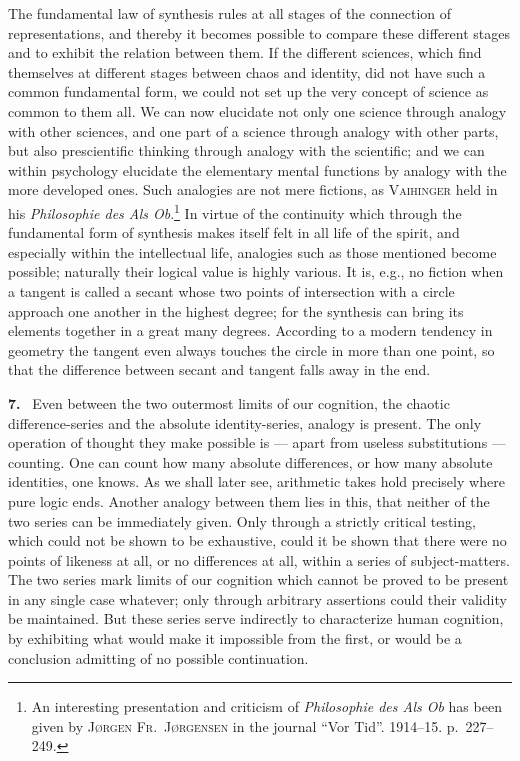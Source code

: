 \documentclass[12pt]{book}
\newcommand{\hnum}[1]{\noindent\textbf{#1.}~}
\newcommand{\opage}[1]{\marginnote{\footnotesize\textit{[#1]}}}
\begin{document}
The fundamental law of synthesis rules at all stages of the con\-nec\-tion of
rep\-re\-sen\-ta\-tions, and thereby it becomes possible to compare these different
stages and to exhibit the relation between them. If the different sciences,
which find themselves at different stages between chaos and identity, did not
have such a common fundamental form, we could not set up the very concept of
science as common to them all. We can now elucidate not only one science through
analogy with other \opage{41}sciences, and one part of a science through analogy with
other parts, but also prescientific thinking through analogy with the
scientific; and we can within psychology elucidate the elementary mental
functions by analogy with the more developed ones. Such analogies are not mere
fictions, as \textsc{Vaihinger} held in his \textit{Philosophie des Als
Ob}.\footnote{An interesting presentation and criticism of \textit{Philosophie
des Als Ob} has been given by \textsc{Jørgen Fr.\ Jørgensen} in the journal
``Vor Tid''. 1914--15. p.\ 227--249.} In virtue of the continuity which through
the fundamental form of synthesis makes itself felt in all life of the spirit,
and especially within the intellectual life, analogies such as those mentioned
become possible; naturally their logical value is highly various. It is, e.g.,
no fiction when a tangent is called a secant whose two points of intersection
with a circle approach one another in the highest degree; for the synthesis can
bring its elements together in a great many degrees. According to a modern
tendency in geometry the tangent even always touches the circle in more than one
point, so that the difference between secant and tangent falls away in the end.

\hnum{7} Even between the two outermost limits of our cognition, the chaotic
difference-series and the absolute identity-series, analogy is present. The only
operation of thought they make possible is --- apart from useless substitutions
--- counting. One can count how many absolute differences, or how many absolute
identities, one knows. As we shall later see, arithmetic takes hold precisely
where pure logic ends. Another analogy between them lies in this, that neither
of the two series can be immediately given. Only through a strictly critical
testing, which could not be shown to be exhaustive, could it be shown that there
were no points of likeness at all, or no \opage{42}differences at all, within a series of
subject-matters. The two series mark limits of our cognition which cannot be
proved to be present in any single case whatever; only through arbitrary
assertions could their validity be maintained. But these series serve indirectly
to characterize human cognition, by exhibiting what would make it impossible
from the first, or would be a conclusion admitting of no possible continuation.
\end{document}
